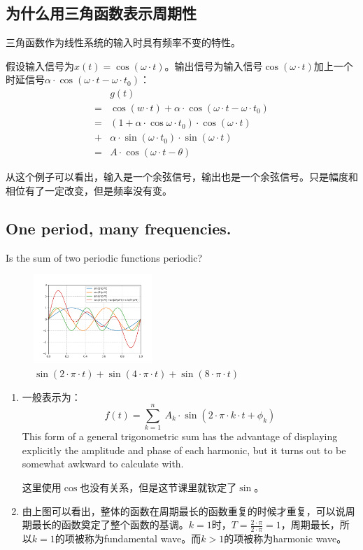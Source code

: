 \subsection{为什么用三角函数表示周期性}
三角函数作为线性系统的输入时具有频率不变的特性。

假设输入信号为$x(t)=\cos (\omega\cdot t)$。输出信号为输入信号$\cos (\omega\cdot t)$加上一个时延信号$\alpha\cdot \cos (\omega\cdot t-\omega\cdot t_0)$：
\begin{align*}
	  & g(t)                                                            \\
	= & \cos(w\cdot t)+\alpha\cdot \cos (\omega\cdot t-\omega\cdot t_0) \\
	= & (1+\alpha \cdot \cos\omega\cdot t_0)\cdot \cos (\omega\cdot t)  \\
	+ & \alpha\cdot \sin(\omega\cdot t_0)\cdot \sin(\omega\cdot t)      \\
	= & A\cdot \cos(\omega\cdot t-\theta)
\end{align*}

从这个例子可以看出，输入是一个余弦信号，输出也是一个余弦信号。只是幅度和相位有了一定改变，但是频率没有变。
\subsection{One period, many frequencies.}
Is the sum of two periodic functions periodic?
\begin{figure}[H]
	\centering
	\includegraphics[width=0.4\textwidth]{assets/Figure_1.png}
	\caption{$\sin(2\cdot\pi\cdot t)+\sin(4\cdot\pi\cdot t)+\sin(8\cdot\pi\cdot t)$}
\end{figure}
\begin{enumerate}
	\item 一般表示为：
	      \begin{equation}\label{vtri}
		      f(t)=\sum\limits_{k=1}^n\ A_k\cdot \sin(2\cdot \pi\cdot k\cdot t+\phi_k)
	      \end{equation}
	      This form of a general trigonometric sum has the advantage of displaying explicitly the amplitude and phase of each harmonic, but it turns out to be somewhat awkward to calculate with.

	      这里使用$\cos$也没有关系，但是这节课里就钦定了$\sin$。
	\item 由上图可以看出，整体的函数在周期最长的函数重复的时候才重复，可以说周期最长的函数奠定了整个函数的基调。$k=1​$时，$T=\frac{2\cdot \pi}{2\cdot \pi}=1​$，周期最长，所以$k=1​$的项被称为fundamental wave。而$k>1​$的项被称为harmonic wave。
\end{enumerate}

